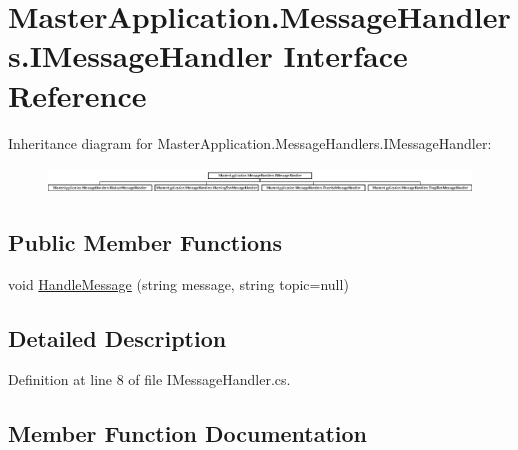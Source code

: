 \hypertarget{interface_master_application_1_1_message_handlers_1_1_i_message_handler}{}\section{Master\+Application.\+Message\+Handlers.\+I\+Message\+Handler Interface Reference}
\label{interface_master_application_1_1_message_handlers_1_1_i_message_handler}
Inheritance diagram for Master\+Application.\+Message\+Handlers.\+I\+Message\+Handler\+:\begin{figure}[H]
\begin{center}
\leavevmode
\includegraphics[height=0.705290cm]{interface_master_application_1_1_message_handlers_1_1_i_message_handler}
\end{center}
\end{figure}
\subsection*{Public Member Functions}
\begin{DoxyCompactItemize}
\item 
void \mbox{\hyperlink{interface_master_application_1_1_message_handlers_1_1_i_message_handler_ada3ca8e0f5f2801663822849a2cfdf40}{Handle\+Message}} (string message, string topic=null)
\end{DoxyCompactItemize}


\subsection{Detailed Description}


Definition at line 8 of file I\+Message\+Handler.\+cs.



\subsection{Member Function Documentation}
\mbox{\label{interface_master_application_1_1_message_handlers_1_1_i_message_handler_ada3ca8e0f5f2801663822849a2cfdf40}} 
